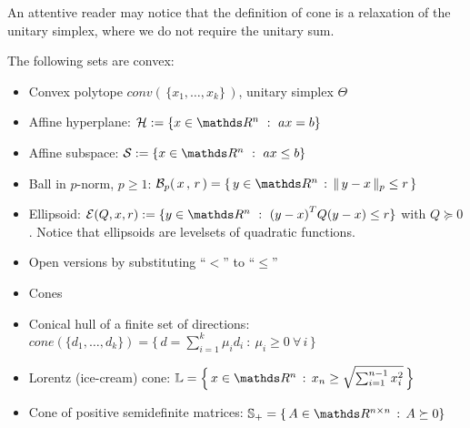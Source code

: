 \documentclass[computationalMathematics.tex]{subfiles}
\begin{document}
An attentive reader may notice that the definition of cone is a relaxation of the unitary simplex, where we do not require the unitary sum.

The following sets are convex:
\begin{itemize}
  \item Convex polytope $conv( \, \{x_1, \ldots, x_k\} \, )$, unitary simplex $\Theta$
  \item Affine hyperplane: $\mathcal{H} := \{x \in \R^n~:~ax = b\}$
  \item Affine subspace: $\mathcal{S} := \{x \in \R^n~:~ ax \leq b\}$
  \item Ball in $p$-norm, $p \geq 1$: $\mathcal{B}_p( \, x \,,\, r \, ) = \{ \, y \in \R^n \,:\, \| \, y - x \, \|_p \leq r \,\}$
  \item Ellipsoid: $\mathcal{E}(Q,x,r) := \{y \in \R^n~:~\tr{(y - x)}Q(y - x) \leq r\}$  with $Q \succeq 0$. Notice that ellipsoids are levelsets of quadratic functions.
  \item Open versions by substituting ``$<$'' to ``$\leq$''
  \item Cones
  \item Conical hull of a finite set of directions: $cone(\{d_1, \ldots, d_k\}) = \Big\{ \, d = \sum\limits_{i=1}^k \mu_i d_i~:~\mu_i \geq 0~\forall \, i \, \Big\}$
  \item Lorentz (ice-cream) cone: $\mathbb{L} = \Big\{ \, x \in \R^n \,:\, x_n \geq \sqrt{\sum_{i=1}^{n-1} x_i^2} \, \Big\}$
  \item Cone of positive semidefinite matrices: $\mathbb{S}_+ = \{ \, A \in \R^{n \times n} \,:\, A \succeq 0\}$
\end{itemize}
\end{document}

